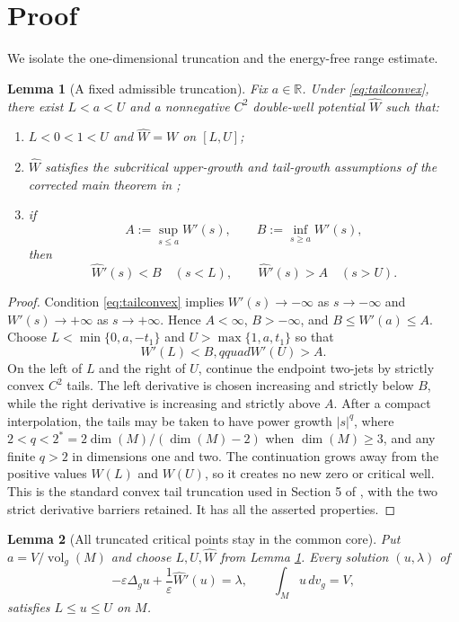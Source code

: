 \documentclass[11pt]{article}
\newtheorem{lemma}{Lemma}
\newcommand{\vol}{\operatorname{vol}}
\begin{document}
\section{Proof}

We isolate the one-dimensional truncation and the energy-free range estimate.

\begin{lemma}[A fixed admissible truncation]\label{lem:trunc}
Fix $a\in\mathbb R$.  Under \eqref{eq:tailconvex}, there exist
$L<a<U$ and a nonnegative $C^2$ double-well potential $\widehat W$ such that:
\begin{enumerate}
 \item $L<0<1<U$ and $\widehat W=W$ on $[L,U]$;
 \item $\widehat W$ satisfies the subcritical upper-growth and tail-growth
 assumptions of the corrected main theorem in \cite{source,corrigendum};
 \item if
 \[
  A:=\sup_{s\le a}W'(s),\qquad B:=\inf_{s\ge a}W'(s),
 \]
 then
 \[
  \widehat W'(s)<B\quad(s<L),\qquad
  \widehat W'(s)>A\quad(s>U).
 \]
\end{enumerate}
\end{lemma}

\begin{proof}
Condition \eqref{eq:tailconvex} implies
$W'(s)\to-\infty$ as $s\to-\infty$ and
$W'(s)\to+\infty$ as $s\to+\infty$.  Hence $A<\infty$, $B>-\infty$, and
$B\le W'(a)\le A$.  Choose $L<\min\{0,a,-t_1\}$ and
$U>\max\{1,a,t_1\}$ so that
\[
 W'(L)<B,qquad W'(U)>A.
\]
On the left of $L$ and the right of $U$, continue the endpoint two-jets by
strictly convex $C^2$ tails.  The left derivative is chosen increasing and
strictly below $B$, while the right derivative is increasing and strictly
above $A$.  After a compact interpolation, the tails may be taken to have
power growth $|s|^q$, where $2<q<2^*=2\dim(M)/(\dim(M)-2)$ when
$\dim(M)\ge3$, and any finite $q>2$ in dimensions one and two.  The
continuation grows away from the positive values $W(L)$ and $W(U)$, so it
creates no new zero or critical well.  This is the standard convex tail
truncation used in Section 5 of \cite{source}, with the two strict derivative
barriers retained.  It has all the asserted properties.
\end{proof}

\begin{lemma}[All truncated critical points stay in the common core]
\label{lem:range}
Put $a=V/\vol_g(M)$ and choose $L,U,\widehat W$ from Lemma
\ref{lem:trunc}.  Every solution $(u,\lambda)$ of
\begin{equation}\label{eq:truncated}
 -\varepsilon\Delta_g u+\frac1\varepsilon\widehat W'(u)=\lambda,
 \qquad \int_Mu\,dv_g=V,
\end{equation}
satisfies $L\le u\le U$ on $M$.
\end{lemma}
\end{document}
